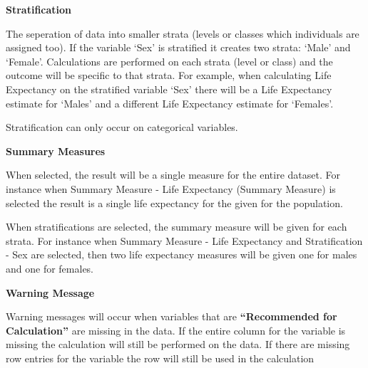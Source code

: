 \documentclass[]{book}
\begin{document}
\textbf{Stratification}

The seperation of data into smaller strata (levels or
classes which individuals are assigned too). If the variable `Sex' is
stratified it creates two strata: `Male' and `Female'. Calculations are
performed on each strata (level or class) and the outcome will be
specific to that strata. For example, when calculating Life Expectancy
on the stratified variable `Sex' there will be a Life Expectancy
estimate for `Males' and a different Life Expectancy estimate for
`Females'.

Stratification can only occur on categorical variables.

\textbf{Summary Measures}

When selected, the result will be a single measure for
the entire dataset. For instance when Summary Measure - Life Expectancy
(Summary Measure) is selected the result is a single life expectancy for
the given for the population.

When stratifications are selected, the summary
measure will be given for each strata. For instance when Summary Measure
- Life Expectancy and Stratification - Sex are selected, then two life
expectancy measures will be given one for males and one for females.

\textbf{Warning Message}

Warning messages will occur when variables that are
\textbf{``Recommended for Calculation''} are missing in the data. If the
entire column for the variable is missing the calculation will still be
performed on the data. If there are missing row entries for the variable
the row will still be used in the calculation
\end{document}
